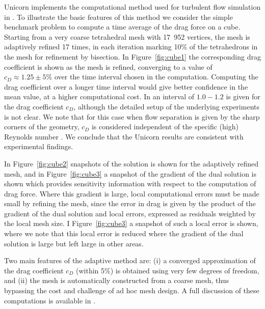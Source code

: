 Unicorn implements the computational method used for turbulent flow simulation in \citet{Hoffman2005,HoffmanJohnson2006b,Hoffman2006,Hoffman2009,HoffmanJansson2009,VilelaJanssonEtAl2010}.
To illustrate the basic features of this method we consider the simple benchmark problem to compute a time average of the drag force on a cube. Starting from a very coarse tetrahedral mesh with 17~952 vertices, the mesh is adaptively refined 17 times, in each iteration marking 10\% of the tetrahedrons in the mesh for refinement by bisection. In Figure~\ref{fig:cube1} the corresponding drag coefficient is shown as the mesh is refined, converging to a value of $c_D\approx 1.25\pm 5\%$ over the time interval chosen in the computation. Computing the drag coefficient over a longer time interval would give better confidence in the mean value, at a higher computational cost. In \citet{Mccormick1995} an interval of $1.0-1.2$ is given for the drag coefficient $c_D$, although the detailed setup of the underlying experiments is not clear. We note that for this case when flow separation is given by the sharp corners of the geometry, $c_D$ is considered independent of the specific (high) Reynolds number \citep{Mccormick1995}.
We conclude that the Unicorn results are consistent with experimental findings.

In Figure~\ref{fig:cube2} snapshots of the solution is shown for the adaptively refined mesh, and in
Figure~\ref{fig:cube3} a snapshot of the gradient of the dual solution is shown which provides sensitivity information with respect to the computation of drag force. Where this gradient is large, local computational errors must be made small by refining the mesh, since the error in drag is given by the product of the gradient of the dual solution and local errors, expressed as residuals weighted by the local mesh size. I Figure~\ref{fig:cube3} a snapshot of such a local error is shown, where we note that this local error is reduced where the gradient of the dual solution is large but left large in other areas.

Two main features of the adaptive method are: (i) a converged approximation of the drag coefficient $c_D$ (within 5\%) is obtained using very few degrees of freedom, and (ii) the mesh is automatically constructed from a coarse mesh, thus bypassing the cost and challenge of ad hoc mesh design. A full discussion of these computations is available in \citet{HoffmanJansson2011}.


